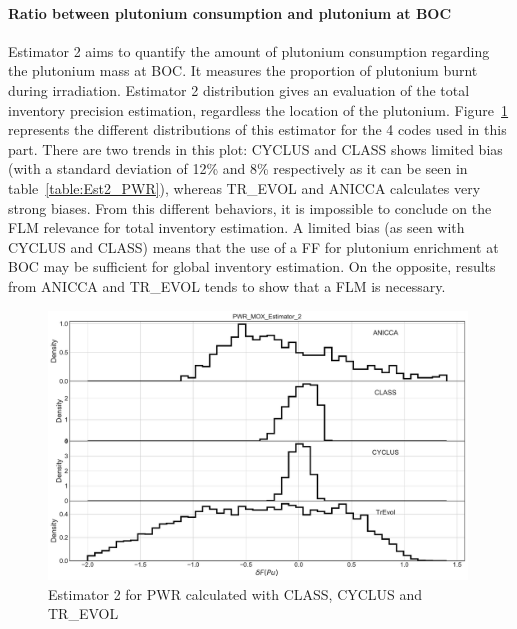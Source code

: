 \paragraph{Ratio between plutonium consumption and plutonium at \gls{BOC}}

Estimator 2 aims to quantify the amount of plutonium consumption regarding the
plutonium mass at \gls{BOC}. It measures the proportion of plutonium burnt
during irradiation. Estimator 2 distribution gives an evaluation of the total
inventory precision estimation, regardless the location of the plutonium.
Figure~\ref{fig:Est2_PWR} represents the different distributions of this estimator
for the 4 codes used in this part. There are two trends in this plot: CYCLUS and
CLASS shows limited bias (with a standard deviation of 12\% and 8\% respectively as it
can be seen in table~\ref{table:Est2_PWR}), whereas TR\_EVOL and ANICCA
calculates very strong biases. From this different behaviors, it is impossible
to conclude on the \gls{FLM} relevance for total inventory estimation. A limited bias
(as seen with CYCLUS and CLASS) means that the use of a \gls{FF} for plutonium
enrichment at \gls{BOC} may be sufficient for global inventory estimation. On the
opposite, results from ANICCA and TR\_EVOL tends to show that a \gls{FLM} is
necessary. 

\begin{figure}[h]
	\begin{center}
		\includegraphics[width = 0.99\textwidth]{../../Feature_1/RAW_DATA/FIG/PWR_MOX_Estimator_2.pdf}
		\caption{Estimator 2 for \gls{PWR} calculated with CLASS, CYCLUS and TR\_EVOL}
		\label{fig:Est2_PWR}
	\end{center}
\end{figure}

